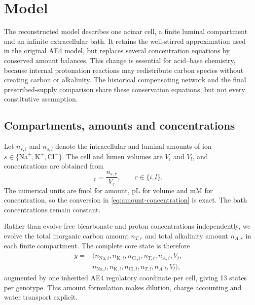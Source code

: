\documentclass[11pt]{article}
\newcommand{\Na}{\mathrm{Na}^{+}}
\newcommand{\K}{\mathrm{K}^{+}}
\newcommand{\Cl}{\mathrm{Cl}^{-}}
\begin{document}
\section{Model}
\label{sec:model}

The reconstructed model describes one acinar cell, a finite luminal compartment and an infinite extracellular bath. It retains the well-stirred approximation used in the original AE4 model, but replaces several concentration equations by conserved amount balances. This change is essential for acid--base chemistry, because internal protonation reactions may redistribute carbon species without creating carbon or alkalinity. The historical compensating network and the final prescribed-supply comparison share these conservation equations, but not every constitutive assumption.

\subsection{Compartments, amounts and concentrations}

Let $n_{s,i}$ and $n_{s,l}$ denote the intracellular and luminal amounts of ion $s\in\{\Na,\K,\Cl\}$. The cell and lumen volumes are $V_i$ and $V_l$, and concentrations are obtained from
\begin{equation}
    [s]_r=\frac{n_{s,r}}{V_r}, \qquad r\in\{i,l\}.
    \label{eq:amount-concentration}
\end{equation}
The numerical units are fmol for amount, pL for volume and mM for concentration, so the conversion in \cref{eq:amount-concentration} is exact. The bath concentrations remain constant.

Rather than evolve free bicarbonate and proton concentrations independently, we evolve the total inorganic carbon amount $n_{T,r}$ and total alkalinity amount $n_{A,r}$ in each finite compartment. The complete core state is therefore
\begin{equation}
\begin{aligned}
    y={}&(n_{\mathrm{Na},i},n_{\mathrm{K},i},n_{\mathrm{Cl},i},n_{T,i},n_{A,i},V_i,\\
       &n_{\mathrm{Na},l},n_{\mathrm{K},l},n_{\mathrm{Cl},l},n_{T,l},n_{A,l},V_l),
\end{aligned}
\label{eq:state-vector}
\end{equation}
augmented by one inherited AE4 regulatory coordinate per cell, giving 13 states per genotype. This amount formulation makes dilution, charge accounting and water transport explicit.
\end{document}
